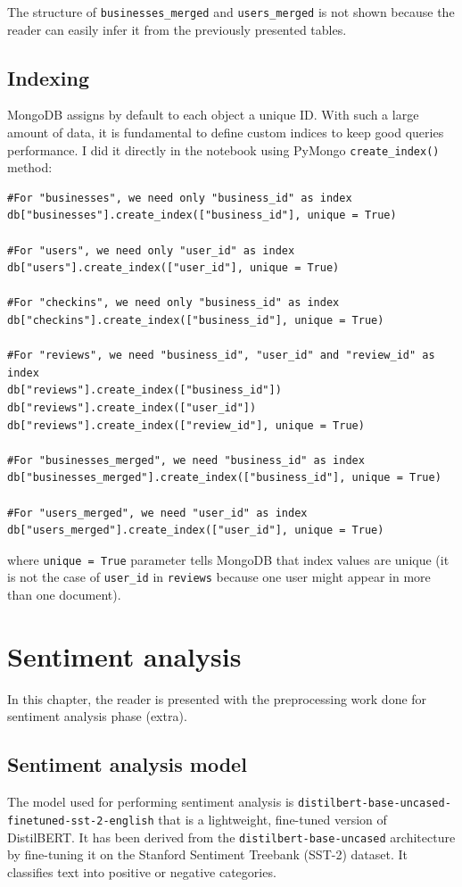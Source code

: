 \documentclass{Configuration_Files/PoliMi3i_thesis}
\begin{document}
The structure of \texttt{businesses\_merged} and \texttt{users\_merged} is not shown because the reader can easily infer it from the previously presented tables.

\section{Indexing}
MongoDB assigns by default to each object a unique ID. With such a large amount of data, it is fundamental to define custom indices to keep good queries performance. I did it directly in the notebook using PyMongo \texttt{create\_index()} method:

\bigskip

\begin{verbatim}
#For "businesses", we need only "business_id" as index
db["businesses"].create_index(["business_id"], unique = True)

#For "users", we need only "user_id" as index
db["users"].create_index(["user_id"], unique = True)

#For "checkins", we need only "business_id" as index
db["checkins"].create_index(["business_id"], unique = True)

#For "reviews", we need "business_id", "user_id" and "review_id" as index
db["reviews"].create_index(["business_id"])
db["reviews"].create_index(["user_id"])
db["reviews"].create_index(["review_id"], unique = True)

#For "businesses_merged", we need "business_id" as index
db["businesses_merged"].create_index(["business_id"], unique = True)

#For "users_merged", we need "user_id" as index
db["users_merged"].create_index(["user_id"], unique = True)
\end{verbatim}

\bigskip

where \texttt{unique = True} parameter tells MongoDB that index values are unique (it is not the case of \texttt{user\_id} in \texttt{reviews} because one user might appear in more than one document). 

\cleardoublepage

\chapter{Sentiment analysis}
In this chapter, the reader is presented with the preprocessing work done for sentiment analysis phase (extra). 

\section{Sentiment analysis model}
\label{sent_model}
The model used for performing sentiment analysis is \texttt{distilbert-base-uncased-\\finetuned-sst-2-english} that is a lightweight, fine-tuned version of DistilBERT. It has been derived from the \texttt{distilbert-base-uncased} architecture by fine-tuning it on the Stanford Sentiment Treebank (SST-2) dataset. It classifies text into positive or negative categories. 
\end{document}
